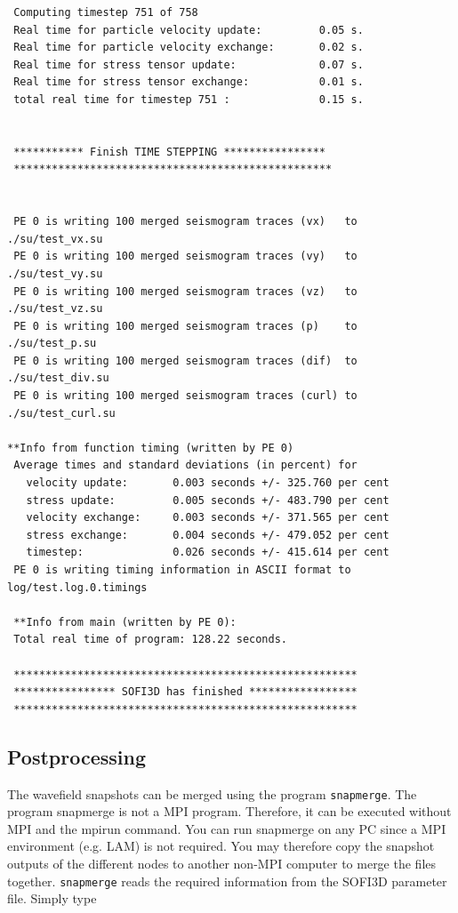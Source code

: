\documentclass[11pt,onecolumn,oneside]{article}
\begin{document}
\begin{verbatim}
 Computing timestep 751 of 758
 Real time for particle velocity update:         0.05 s.
 Real time for particle velocity exchange:       0.02 s.
 Real time for stress tensor update:             0.07 s.
 Real time for stress tensor exchange:           0.01 s.
 total real time for timestep 751 :              0.15 s.


 *********** Finish TIME STEPPING ****************
 **************************************************


 PE 0 is writing 100 merged seismogram traces (vx)   to  ./su/test_vx.su
 PE 0 is writing 100 merged seismogram traces (vy)   to  ./su/test_vy.su
 PE 0 is writing 100 merged seismogram traces (vz)   to  ./su/test_vz.su
 PE 0 is writing 100 merged seismogram traces (p)    to  ./su/test_p.su
 PE 0 is writing 100 merged seismogram traces (dif)  to  ./su/test_div.su
 PE 0 is writing 100 merged seismogram traces (curl) to  ./su/test_curl.su

**Info from function timing (written by PE 0)
 Average times and standard deviations (in percent) for
   velocity update:       0.003 seconds +/- 325.760 per cent
   stress update:         0.005 seconds +/- 483.790 per cent
   velocity exchange:     0.003 seconds +/- 371.565 per cent
   stress exchange:       0.004 seconds +/- 479.052 per cent
   timestep:              0.026 seconds +/- 415.614 per cent
 PE 0 is writing timing information in ASCII format to log/test.log.0.timings

 **Info from main (written by PE 0):
 Total real time of program: 128.22 seconds.

 ******************************************************
 **************** SOFI3D has finished *****************
 ******************************************************
\end{verbatim}  

\subsection{Postprocessing}

The wavefield snapshots can be merged using the program  \lstinline{snapmerge}. The program snapmerge is not a MPI program. Therefore, it can be executed without MPI and the mpirun command. You can run snapmerge on any PC since a MPI environment (e.g. LAM) is not required. You may therefore copy the snapshot outputs of the different nodes to another non-MPI computer to merge the files together.  \lstinline{snapmerge} reads the required information from the SOFI3D parameter file. Simply type
\end{document}
